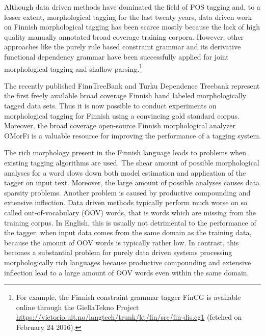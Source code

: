 Although data driven methods have dominated the field of POS tagging
and, to a lesser extent, morphological tagging for the last twenty
years, data driven work on Finnish morphological tagging has been
scarce mostly because the lack of high quality manually annotated
broad coverage training corpora. However, other approaches like the
purely rule based constraint grammar \citep{Karlsson1995} and its
derivative functional dependency grammar \citep{Tapanainen1997} have
been successfully applied for joint morphological tagging and
shallow parsing.\footnote{For example, the Finnish constraint grammar
  tagger FinCG is available online through the GiellaTekno Project
  \citep{gt}
  \url{https://victorio.uit.no/langtech/trunk/kt/fin/src/fin-dis.cg1}
  (fetched on February 24 2016).}

The recently published FinnTreeBank \citep{Voutilainen2011} and Turku
Dependence Treebank \citep{Haverinen2013} represent the first freely
available broad coverage Finnish hand labeled morphologically tagged
data sets. Thus it is now possible to conduct experiments on
morphological tagging for Finnish using a convincing gold standard
corpus. Moreover, the broad coverage open-source Finnish morphological
analyzer OMorFi \citep{Pirinen2011} is a valuable resource for
improving the performance of a tagging system. 

The rich morphology present in the Finnish language leads to problems
when existing tagging algorithms are used. The shear amount of
possible morphological analyses for a word slows down both model
estimation and application of the tagger on input text. Moreover, the
large amount of possible analyses causes data sparsity
problems. Another problem is caused by productive compounding and
extensive inflection.  Data driven methods typically perform much
worse on so called out-of-vocabulary (OOV) words, that is words which
are missing from the training corpus. In English, this is usually not
detrimental to the performance of the tagger, when input data comes
from the same domain as the training data, because the amount of OOV
words is typically rather low. In contrast, this becomes a substantial
problem for purely data driven systems processing morphologically rich
languages because productive compounding and extensive inflection lead
to a large amount of OOV words even within the same domain.

